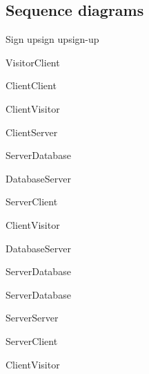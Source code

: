 \begin{toexclude}

  \subsection{Sequence diagrams}

  \begin{sdfig}{Sign up}{sign up}{sign-up}

    \begin{umlcall}[op={Sign up}]{Visitor}{Client}
      \begin{umlcall}[op={Validate}]{Client}{Client}
        \begin{umlfragment}[type=alt, label=valid]
          \begin{umlcall}[type=return,op={Loading}]{Client}{Visitor}
            \begin{umlcall}[op={Sign up}]{Client}{Server}
              \begin{umlcall}[op={Has user}]{Server}{Database}
                \begin{umlfragment}[type=alt, label=true]
                  \begin{umlcall}[type=return,op={Yes}]{Database}{Server}
                    \begin{umlcall}[type=return,op={Error}]{Server}{Client}
                      \begin{umlcall}[type=return,op={Error}]{Client}{Visitor}
                      \end{umlcall}
                    \end{umlcall}
                  \end{umlcall}
                  \umlfpart[else]
                  \begin{umlcall}[type=return,op={No}]{Database}{Server}
                    \begin{umlcall}[op={Create user}]{Server}{Database}
                    \end{umlcall}
                    \begin{umlcall}[op={Create OTP}]{Server}{Database}
                      \begin{umlcall}[op={Send email}]{Server}{Server}
                        \begin{umlcall}[type=return,op={Done}]{Server}{Client}
                          \begin{umlcall}[type=return,op={Done}]{Client}{Visitor}

\end{umlcall}
\end{umlcall}
\end{umlcall}
\end{umlcall}
\end{umlcall}
\end{umlfragment}
\end{umlcall}
\end{umlcall}
\end{umlcall}
\end{umlfragment}
\end{umlcall}
\end{umlcall}
\end{sdfig}
\end{toexclude}
